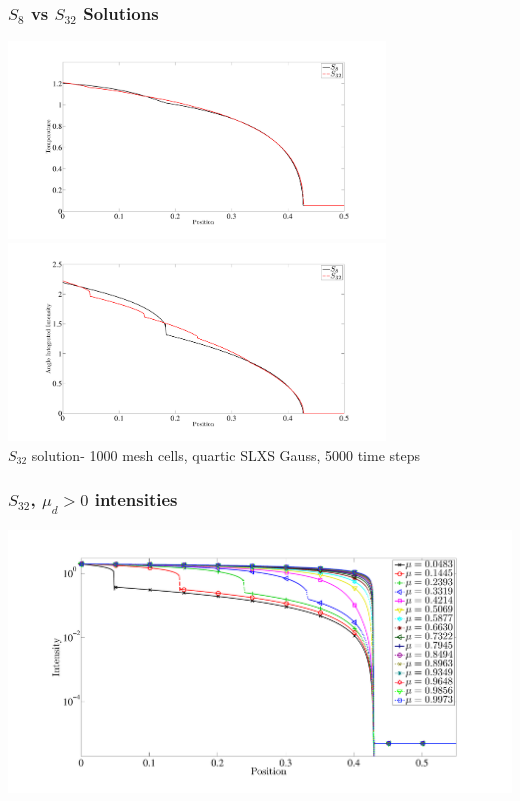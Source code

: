 \documentclass{beamer}
\begin{document}
\begin{frame}
\frametitle{$S_8$ vs $S_{32}$ Solutions}
\centering
\includegraphics[width=0.75\textwidth,height=0.4\textheight,trim=1.5in  0.2in 0.5in 0.75in,clip=true]{../chapter6_grey_radtran/Dissertation_Data/S8_vs_S32_Material_Temperature.pdf}
%
\\
\includegraphics[width=0.75\textwidth,height=0.4\textheight,trim=1.5in  0.2in 0.5in 0.75in,clip=true]{../chapter6_grey_radtran/Dissertation_Data/S8_vs_S32_Radiation.pdf}
\\
$S_{32}$ solution- 1000 mesh cells, quartic SLXS Gauss, 5000 time steps
\end{frame}

\begin{frame}
\frametitle{$S_{32}$, $\mu_d > 0$ intensities}

\includegraphics[width=\textwidth,trim=1.5in  0.2in 0.5in 0.75in,clip=true]{../chapter6_grey_radtran/Dissertation_Data/S32_Intensity.pdf}

\end{frame}
\end{document}
